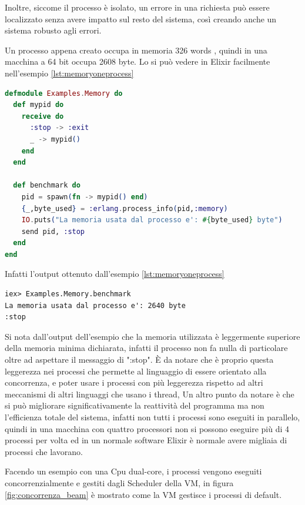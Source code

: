Inoltre, siccome il processo è isolato, un errore in una richiesta
può essere localizzato senza avere impatto
sul resto del sistema, così creando anche un sistema robusto
agli errori.

Un processo appena creato occupa in memoria 326 words \cite{ErlangPr21:online},
quindi in una macchina a 64 bit occupa 2608 byte.
Lo si può vedere in Elixir facilmente nell'esempio \ref{lst:memoryoneprocess}

\begin{lstlisting}[language=elixir, caption={Memoria in un processo},captionpos=b,
	label={lst:memoryoneprocess}]
defmodule Examples.Memory do
  def mypid do
    receive do
      :stop -> :exit
      _ -> mypid()
    end
  end
 
  def benchmark do
    pid = spawn(fn -> mypid() end)
    {_,byte_used} = :erlang.process_info(pid,:memory)
    IO.puts("La memoria usata dal processo e': #{byte_used} byte")
    send pid, :stop
  end
end
\end{lstlisting}

Infatti l'output ottenuto dall'esempio \ref{lst:memoryoneprocess}
\begin{lstlisting}[language=none]
iex> Examples.Memory.benchmark
La memoria usata dal processo e': 2640 byte
:stop
\end{lstlisting}
	
Si nota dall'output dell'esempio che la memoria utilizzata
è leggermente superiore della memoria minima dichiarata,
infatti il processo non fa nulla di particolare oltre
ad aspettare il messaggio di ":stop".
È da notare che è proprio questa leggerezza nei processi che
permette al linguaggio di essere orientato alla concorrenza,
e poter usare i processi con più leggerezza rispetto
ad altri meccanismi di altri linguaggi che usano i thread,
Un altro punto da notare è che si può migliorare significativamente
la reattività del programma ma non l'efficienza totale del
sistema, infatti non tutti i processi
sono eseguiti in parallelo, quindi in una macchina con quattro
processori non si possono eseguire più di 4 processi per volta
ed in un normale software Elixir è normale avere migliaia di
processi che lavorano.

Facendo un esempio con una Cpu dual-core,
i processi vengono eseguiti concorrenzialmente e gestiti
dagli Scheduler della VM,
in figura \ref{fig:concorrenza_beam} è mostrato come
la VM gestisce i processi di default.

